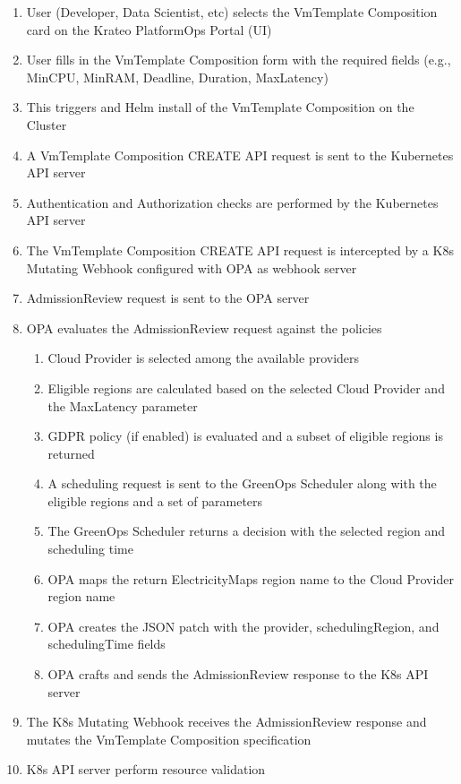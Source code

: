\begin{enumerate}
  \item User (Developer, Data Scientist, etc) selects the VmTemplate Composition card on the Krateo PlatformOps Portal (UI)
  \item User fills in the VmTemplate Composition form with the required fields (e.g., MinCPU, MinRAM, Deadline, Duration, MaxLatency)
  \item This triggers and Helm install of the VmTemplate Composition on the Cluster
  \item A VmTemplate Composition CREATE API request is sent to the Kubernetes API server
  \item Authentication and Authorization checks are performed by the Kubernetes API server
  \item The VmTemplate Composition CREATE API request is intercepted by a K8s Mutating Webhook configured with OPA as webhook server
  \item AdmissionReview request is sent to the OPA server
  \item OPA evaluates the AdmissionReview request against the policies
  \begin{enumerate}
    \item Cloud Provider is selected among the available providers
    \item Eligible regions are calculated based on the selected Cloud Provider and the MaxLatency parameter
    \item GDPR policy (if enabled) is evaluated and a subset of eligible regions is returned
    \item A scheduling request is sent to the GreenOps Scheduler along with the eligible regions and a set of parameters
    \item The GreenOps Scheduler returns a decision with the selected region and scheduling time
    \item OPA maps the return ElectricityMaps region name to the Cloud Provider region name
    \item OPA creates the JSON patch with the provider, schedulingRegion, and schedulingTime fields
    \item OPA crafts and sends the AdmissionReview response to the K8s API server 
  \end{enumerate}
  \item The K8s Mutating Webhook receives the AdmissionReview response and mutates the VmTemplate Composition specification
  \item K8s API server perform resource validation

\end{enumerate}
